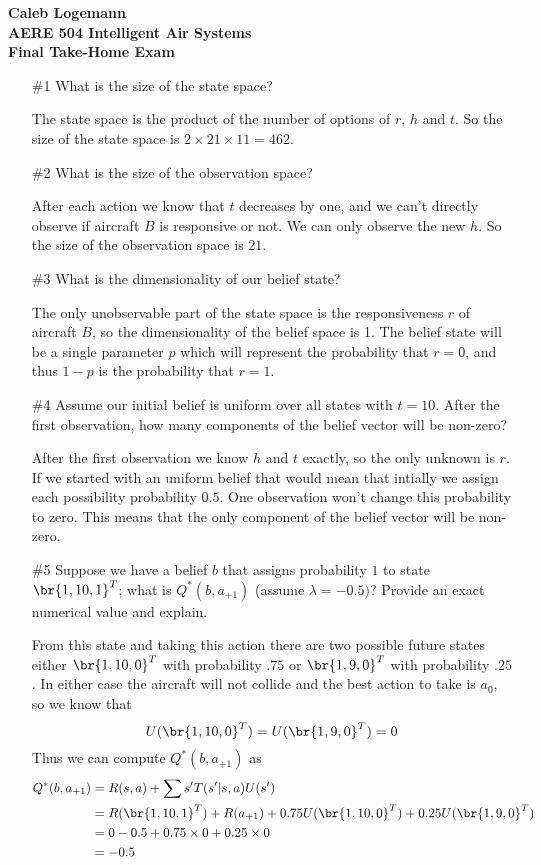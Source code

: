 \documentclass[12pt, oneside]{article}
\begin{document}
\noindent \textbf{\Large{Caleb Logemann \\
AERE 504 Intelligent Air Systems \\
Final Take-Home Exam
}}

\begin{enumerate}
  \item[\#1] %
    What is the size of the state space?

    The state space is the product of the number of options of $r$, $h$ and $t$.
    So the size of the state space is $2 \times 21 \times 11 = 462$.

  \item[\#2] %
    What is the size of the observation space?

    After each action we know that $t$ decreases by one, and we can't directly
    observe if aircraft $B$ is responsive or not.
    We can only observe the new $h$.
    So the size of the observation space is $21$.

  \item[\#3] %
    What is the dimensionality of our belief state?

    The only unobservable part of the state space is the responsiveness $r$ of
    aircraft $B$, so the dimensionality of the belief space is 1.
    The belief state will be a single parameter $p$ which will represent the
    probability that $r = 0$, and thus $1 - p$ is the probability that $r = 1$.

  \item[\#4] %
    Assume our initial belief is uniform over all states with $t = 10$.
    After the first observation, how many components of the belief vector will
    be non-zero?

    After the first observation we know $h$ and $t$ exactly, so the only
    unknown is $r$.
    If we started with an uniform belief that would mean that intially we assign
    each possibility probability $0.5$.
    One observation won't change this probability to zero.
    This means that the only component of the belief vector will be non-zero.

  \item[\#5] %
    Suppose we have a belief $b$ that assigns probability $1$ to state
    $\br{1, 10, 1}^T$; what is $Q^*(b, a_{+1})$ (assume $\lambda = -0.5)$?
    Provide an exact numerical value and explain.

    From this state and taking this action there are two possible future states
    either $\br{1, 10, 0}^T$ with probability $.75$ or $\br{1, 9, 0}^T$ with
    probability $.25$.
    In either case the aircraft will not collide and the best action to take
    is $a_0$, so we know that
    \[
      U(\br{1, 10, 0}^T) = U(\br{1, 9, 0}^T) = 0
    \]
    Thus we can compute $Q^*(b, a_{+1})$ as
    \begin{align*}
      Q^*(b, a_{+1}) &= R(s, a) + \sum{s'}{}{T(s'|s, a)U(s')} \\
      &= R(\br{1, 10, 1}^T) + R(a_{+1}) + 0.75 U(\br{1, 10, 0}^T) + 0.25 U(\br{1, 9, 0}^T)\\
      &= 0 - 0.5 + 0.75 \times 0 + 0.25 \times 0 \\
      &= -0.5
    \end{align*}


\end{enumerate}
\end{document}
